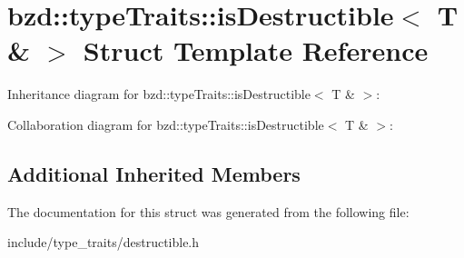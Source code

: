 \hypertarget{structbzd_1_1typeTraits_1_1isDestructible_3_01T_01_6_01_4}{}\section{bzd\+:\+:type\+Traits\+:\+:is\+Destructible$<$ T \& $>$ Struct Template Reference}
\label{structbzd_1_1typeTraits_1_1isDestructible_3_01T_01_6_01_4}


Inheritance diagram for bzd\+:\+:type\+Traits\+:\+:is\+Destructible$<$ T \& $>$\+:


Collaboration diagram for bzd\+:\+:type\+Traits\+:\+:is\+Destructible$<$ T \& $>$\+:
\subsection*{Additional Inherited Members}


The documentation for this struct was generated from the following file\+:\begin{DoxyCompactItemize}
\item 
include/type\+\_\+traits/destructible.\+h\end{DoxyCompactItemize}
